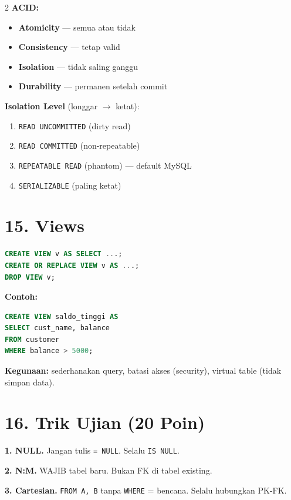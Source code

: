 \documentclass[10pt,a4paper]{article}
\begin{document}
\begin{multicols*}{2}
	\textbf{ACID:}
	\begin{itemize}
		\item \textbf{Atomicity} — semua atau tidak
		\item \textbf{Consistency} — tetap valid
		\item \textbf{Isolation} — tidak saling ganggu
		\item \textbf{Durability} — permanen setelah commit
	\end{itemize}

	\textbf{Isolation Level} (longgar $\to$ ketat):
	\begin{enumerate}
		\item \texttt{READ UNCOMMITTED} (dirty read)
		\item \texttt{READ COMMITTED} (non-repeatable)
		\item \texttt{REPEATABLE READ} (phantom) — default MySQL
		\item \texttt{SERIALIZABLE} (paling ketat)
	\end{enumerate}

	\section*{15. Views}

	\begin{lstlisting}[language=SQL]
CREATE VIEW v AS SELECT ...;
CREATE OR REPLACE VIEW v AS ...;
DROP VIEW v;
\end{lstlisting}

	\textbf{Contoh:}
	\begin{lstlisting}[language=SQL]
CREATE VIEW saldo_tinggi AS
SELECT cust_name, balance
FROM customer
WHERE balance > 5000;
\end{lstlisting}

	\textbf{Kegunaan:} sederhanakan query, batasi akses (security), virtual table (tidak simpan data).

	\section*{16. Trik Ujian (20 Poin)}

	\textbf{1. NULL.} Jangan tulis \texttt{= NULL}. Selalu \texttt{IS NULL}.

	\textbf{2. N:M.} WAJIB tabel baru. Bukan FK di tabel existing.

	\textbf{3. Cartesian.} \texttt{FROM A, B} tanpa \texttt{WHERE} = bencana. Selalu hubungkan PK-FK.


\end{multicols*}
\end{document}
